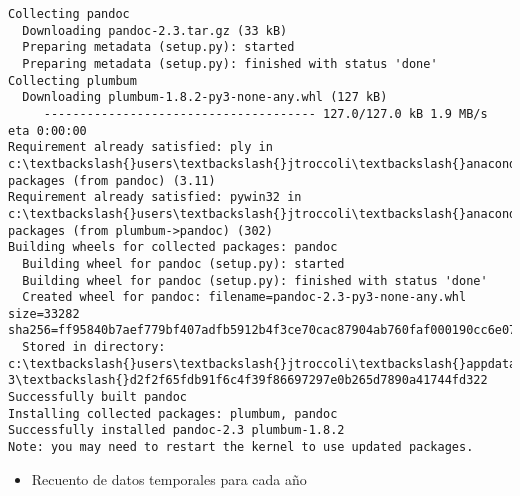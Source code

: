 \documentclass[11pt]{article}
\providecommand{\tightlist}{%
      \setlength{\itemsep}{0pt}\setlength{\parskip}{0pt}}
\begin{document}
    \begin{Verbatim}[commandchars=\\\{\}]
Collecting pandoc
  Downloading pandoc-2.3.tar.gz (33 kB)
  Preparing metadata (setup.py): started
  Preparing metadata (setup.py): finished with status 'done'
Collecting plumbum
  Downloading plumbum-1.8.2-py3-none-any.whl (127 kB)
     -------------------------------------- 127.0/127.0 kB 1.9 MB/s eta 0:00:00
Requirement already satisfied: ply in c:\textbackslash{}users\textbackslash{}jtroccoli\textbackslash{}anaconda3\textbackslash{}lib\textbackslash{}site-
packages (from pandoc) (3.11)
Requirement already satisfied: pywin32 in c:\textbackslash{}users\textbackslash{}jtroccoli\textbackslash{}anaconda3\textbackslash{}lib\textbackslash{}site-
packages (from plumbum->pandoc) (302)
Building wheels for collected packages: pandoc
  Building wheel for pandoc (setup.py): started
  Building wheel for pandoc (setup.py): finished with status 'done'
  Created wheel for pandoc: filename=pandoc-2.3-py3-none-any.whl size=33282
sha256=ff95840b7aef779bf407adfb5912b4f3ce70cac87904ab760faf000190cc6e07
  Stored in directory: c:\textbackslash{}users\textbackslash{}jtroccoli\textbackslash{}appdata\textbackslash{}local\textbackslash{}pip\textbackslash{}cache\textbackslash{}wheels\textbackslash{}14\textbackslash{}2e\textbackslash{}1
3\textbackslash{}d2f2f65fdb91f6c4f39f86697297e0b265d7890a41744fd322
Successfully built pandoc
Installing collected packages: plumbum, pandoc
Successfully installed pandoc-2.3 plumbum-1.8.2
Note: you may need to restart the kernel to use updated packages.
    \end{Verbatim}

    \begin{itemize}
\tightlist
\item
  Recuento de datos temporales para cada año
\end{itemize}
\end{document}
